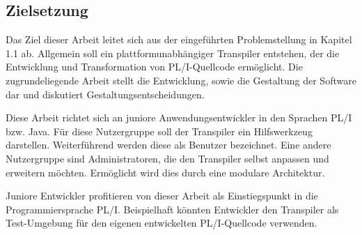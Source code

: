 

% 	 
%	 
%
 \pagebreak
\subsection{Zielsetzung}
Das Ziel dieser Arbeit leitet sich aus der eingeführten Problemstellung in Kapitel 1.1 ab. Allgemein soll ein plattformunabhängiger Transpiler entstehen, der die  Entwicklung und Transformation von PL/I-Quellcode ermöglicht. Die zugrundeliegende Arbeit stellt die Entwicklung, sowie die Gestaltung der Software dar und diskutiert Gestaltungsentscheidungen. 

Diese Arbeit richtet sich an juniore Anwendungsentwickler in den Sprachen PL/I bzw. Java. Für diese Nutzergruppe soll der Transpiler ein Hilfswerkzeug darstellen. Weiterführend werden diese als Benutzer bezeichnet. Eine andere Nutzergruppe sind Administratoren, die den Transpiler selbst anpassen und erweitern möchten. Ermöglicht wird dies durch eine modulare Architektur.
	
Juniore Entwickler profitieren von dieser Arbeit als Einstiegspunkt in die Programmiersprache PL/I. Beispielhaft könnten Entwickler den Transpiler als Test-Umgebung für den eigenen entwickelten PL/I-Quellcode verwenden.

